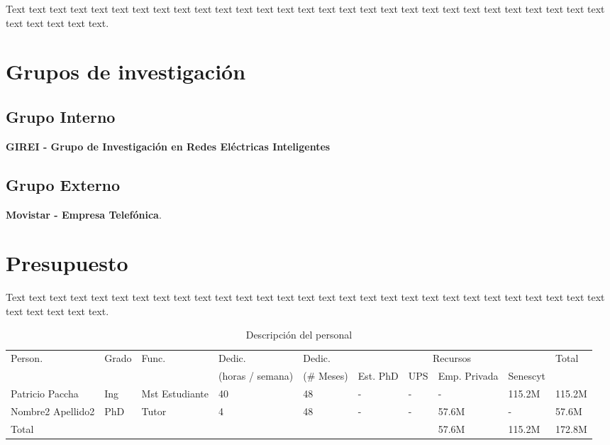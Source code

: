 \documentclass[12pt,a4paper]{article}
\begin{document}
Text text text text text text text text text text text  text text text text text text text text text text text text text text text text text text text text text text text.
\section{Grupos de investigación}
\subsection{Grupo Interno}

\textbf{GIREI - Grupo de Investigación en Redes Eléctricas Inteligentes}
\subsection{Grupo Externo}

\textbf{Movistar - Empresa Telefónica}. 
\section{Presupuesto}
Text text text text text text text text text text text  text text text text text text text text text text text text text text text text text text text text text text text.


\begin{table}[ht!]
\caption{Descripción del personal}
\begin{tabular}{|p{1.1cm}|p{1.1cm}|p{1.1cm}|p{1.1cm}|p{1.3cm}|p{1.1cm}|p{1.1cm}|p{1.1cm}|p{1.1cm}|p{1.1cm}|} \hline
Person. & Grado & Func. & Dedic.  & Dedic.  & \multicolumn{4}{|c|}{Recursos} & Total \\ \cline{6-9}
  &   &   & (horas / semana)  &  (\# Meses) & Est. PhD  & UPS & Emp. Privada & Senescyt &  \\ \hline \hline
  Patricio Paccha  & Ing  & Mst Estudiante  & 40 & 48 & - & - & - & 115.2M & 115.2M \\ \hline
  Nombre2 Apellido2  & PhD  & Tutor & 4 & 48 & - & - & 57.6M & - & 57.6M \\ \hline
Total &    &   &   &   &   &   & 57.6M &  115.2M & 172.8M \\ \hline
\end{tabular}
\end{table}
\end{document}
